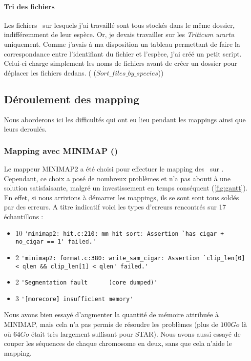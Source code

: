 \documentclass[../main]{subfiles} %
\begin{document}
\paragraph{Tri des fichiers}
Les fichiers \fastq sur lesquels  j’ai travaillé sont tous stockés dans le même dossier, indifféremment de leur espèce. Or, je devais travailler sur les \textit{Triticum urartu} uniquement. Comme j’avais à ma disposition un tableau permettant de faire la correspondance entre l’identifiant du fichier et l’espèce, j’ai créé un petit script. Celui-ci charge simplement les noms de fichiers avant de créer un dossier pour déplacer les fichiers dedans. (\cite{florent_f-marchalm1bioinfointernship2024-inrae_agap_ge2pop_2024} ($Sort\_files\_by\_species$))


\subsection{Déroulement des \gls{mapping}}

Nous aborderons ici les difficultés qui ont eu lieu pendant les mappings ainsi que leurs deroulés.
\subsubsection{Mapping avec \gls{MINIMAP} (\GeMo)}
\label{sec:Minimap}
Le \gls{mappeur} MINIMAP2 a été choisi pour effectuer le \gls{mapping} des \fastq sur \GeMo. Cependant, ce choix a posé de nombreux problèmes et n'a pas abouti à une solution satisfaisante, malgré un investissement en temps conséquent (\cref{fig:gantt}). En effet, si nous arrivions à démarrer les \glspl{mapping}, ils se sont sont tous soldés par des erreurs. A titre indicatif voici les types d’erreurs rencontrés sur 17 échantillons :

\begin{itemize}
    \item  10 \lstinline{'minimap2: hit.c:210: mm_hit_sort: Assertion `has_cigar + no_cigar == 1' failed.'}
    \item 2 \lstinline{'minimap2: format.c:380: write_sam_cigar: Assertion `clip_len[0] < qlen && clip_len[1] < qlen' failed.'}
    \item 2 \lstinline{'Segmentation fault      (core dumped)'}
    \item 3 \lstinline{'[morecore] insufficient memory'}
\end{itemize}

Nous avons bien essayé d’augmenter la quantité de mémoire attribuée à \gls{MINIMAP}, mais cela n’a pas permis de résoudre les problèmes (plus de $\num{100} Go$ là où $\num{64} Go$ était très largement suffisant pour \gls{STAR}). Nous avons aussi essayé de couper les séquences de chaque chromosome en deux, sans que cela n'aide le \gls{mapping}. 
\end{document}
